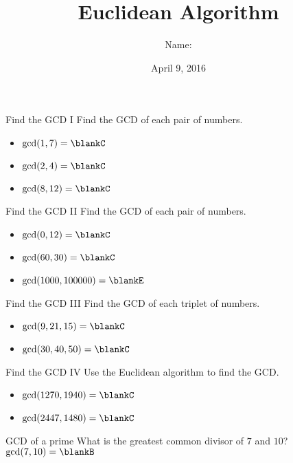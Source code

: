 \documentclass[12pt,letterpaper]{article}
\title{Euclidean Algorithm}
\author{Name: \underline{\hspace{5cm}}}
\date{April 9, 2016}
\begin{document}
\maketitle

\thispagestyle{empty}

\begin{problem}{Find the GCD I}
 Find the GCD of each pair of numbers.

 \begin{itemize}
  \item $\gcd(1, 7) = \blankC$
  \item $\gcd(2, 4) = \blankC$
  \item $\gcd(8, 12) = \blankC$
 \end{itemize}
\end{problem}

\begin{problem}{Find the GCD II}
 Find the GCD of each pair of numbers.

 \begin{itemize}
  \item $\gcd(0, 12) = \blankC$
  \item $\gcd(60, 30) = \blankC$
  \item $\gcd(1000, 100000) = \blankE$
 \end{itemize}
\end{problem}

\begin{problem}{Find the GCD III}
 Find the GCD of each triplet of numbers.

 \begin{itemize}
  \item $\gcd(9, 21, 15) = \blankC$
  \item $\gcd(30, 40, 50) = \blankC$
 \end{itemize}
\end{problem}

\begin{problem}{Find the GCD IV}
 Use the Euclidean algorithm to find the GCD.

 \begin{itemize}
  \item $\gcd(1270, 1940) = \blankC$
  \item $\gcd(2447, 1480) = \blankC$
 \end{itemize}
\end{problem}

\begin{problem}{GCD of a prime}
 What is the greatest common divisor of $7$ and $10$? \hfill
 $\gcd(7, 10) = \blankB$
\end{problem}
\end{document}
